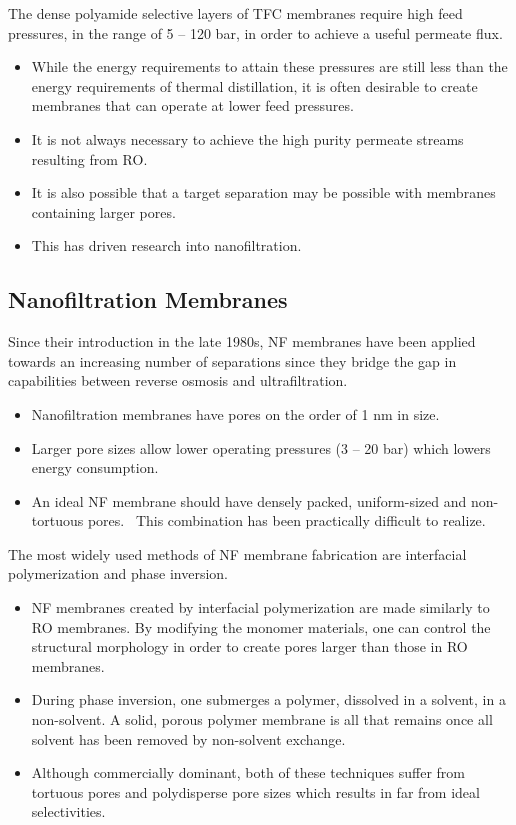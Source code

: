   The dense polyamide selective layers of TFC membranes require high feed pressures,
  in the range of 5 -- 120 bar, in order to achieve a useful permeate flux.~\cite{van_der_bruggen_review_2003}
  \begin{itemize}
    \item While the energy requirements to attain these pressures are still less than 
    the energy requirements of thermal distillation\cite{morton_environmental_1997}, it 
    is often desirable to create membranes that can operate at lower feed pressures.
    \item It is not always necessary to achieve the high purity permeate streams
    resulting from RO.
    \item It is also possible that a target separation may be possible with 
    membranes containing larger pores.
    \item This has driven research into nanofiltration.
  \end{itemize}
  
  \subsection{Nanofiltration Membranes}

  Since their introduction in the late 1980s, NF membranes have been applied towards
  an increasing number of separations since they bridge the gap in capabilities
  between reverse osmosis and ultrafiltration.~\cite{eriksson_nanofiltration_1988}
  \begin{itemize}
    \item Nanofiltration membranes have pores on the order of 1 nm in size. 
    \item Larger pore sizes allow lower operating pressures (3 -- 20 bar) which lowers 
    energy consumption.~\cite{van_der_bruggen_review_2003}
    \item An ideal NF membrane should have densely packed, uniform-sized and non-tortuous pores.~\cite{jackson_nanoporous_2010}
    This combination has been practically difficult to realize.
  \end{itemize}
  
  The most widely used methods of NF membrane fabrication are interfacial polymerization
  and phase inversion.
  \begin{itemize}
    \item NF membranes created by interfacial polymerization are made similarly to
    RO membranes. By modifying the monomer materials, one can control the structural morphology
    in order to create pores larger than those in RO membranes.~\cite{seman_nanofiltration_2010}
    \item During phase inversion, one submerges a polymer, dissolved in a solvent, in
    a non-solvent. A solid, porous polymer membrane is all that remains once all
    solvent has been removed by non-solvent exchange.~\cite{smolders_microstructures_1992}
    \item Although commercially dominant, both of these techniques suffer from
    tortuous pores and polydisperse pore sizes which results in far from ideal 
    selectivities.
  \end{itemize}  
    
